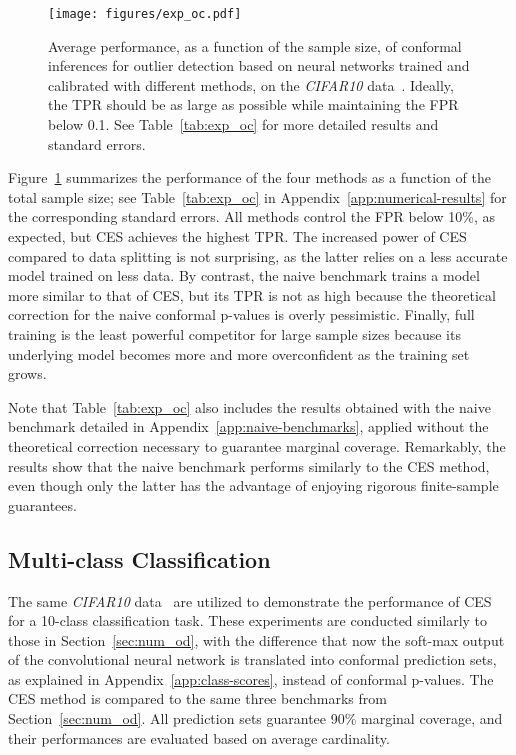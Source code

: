 \begin{figure}[!htb]
    \centering
    \texttt{[image: figures/exp\_oc.pdf]}\vspace{-0.5cm}
    \caption{Average performance, as a function of the sample size, of conformal inferences for outlier detection based on neural networks trained and calibrated with different methods, on the {\em CIFAR10} data~\citep{cifar10}. Ideally, the TPR should be as large as possible while maintaining the FPR below 0.1. See Table~\ref{tab:exp_oc} for more detailed results and standard errors.}%
    \label{fig:exp_oc}
\end{figure}

Figure~\ref{fig:exp_oc} summarizes the performance of the four methods as a function of the total sample size; see Table~\ref{tab:exp_oc} in Appendix~\ref{app:numerical-results} for the corresponding standard errors. All methods control the FPR below 10\%, as expected, but CES achieves the highest TPR.
The increased power of CES compared to data splitting is not surprising, as the latter relies on a less accurate model trained on less data.
By contrast, the naive benchmark trains a model more similar to that of CES, but its TPR is not as high because the theoretical correction for the naive conformal p-values is overly pessimistic.
Finally, full training is the least powerful competitor for large sample sizes because its underlying model becomes more and more overconfident as the training set grows.

Note that Table~\ref{tab:exp_oc} also includes the results obtained with the naive benchmark detailed in Appendix~\ref{app:naive-benchmarks}, applied without the theoretical correction necessary to guarantee marginal coverage. Remarkably, the results show that the naive benchmark performs similarly to the CES method, even though only the latter has the advantage of enjoying rigorous finite-sample guarantees.

\subsection{Multi-class Classification} \label{sec:num_mc}

The same {\em CIFAR10} data~\citep{cifar10} are utilized to demonstrate the performance of CES for a 10-class classification task.
These experiments are conducted similarly to those in Section~\ref{sec:num_od}, with the difference that now the soft-max output of the convolutional neural network is translated into conformal prediction sets, as explained in Appendix~\ref{app:class-scores}, instead of conformal p-values.
The CES method is compared to the same three benchmarks from Section~\ref{sec:num_od}. All prediction sets guarantee 90\% marginal coverage, and their performances are evaluated based on average cardinality.

